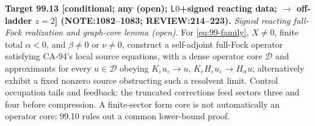 \textbf{Target 99.13 [conditional; any (open); \(\mathsf L0\)+signed reacting data; \(\to\) off-ladder \(z=2\)]
(NOTE:1082--1083; REVIEW:214--223).}
\emph{Signed reacting full-Fock realization and graph-core lemma (open).} For \eqref{eq:99-family}, \(X\ne0\), finite total
\(\alpha<0\), and \(\beta\ne0\) or \(\nu\ne0\), construct a self-adjoint full-Fock operator satisfying CA-94's local source
equations, with a dense operator core \(\mathcal D\) and approximants for every \(u\in\mathcal D\) obeying
\(K_\varepsilon u_\varepsilon\to u\), \(K_\varepsilon H_\varepsilon u_\varepsilon\to H_\alpha u\); alternatively exhibit a fixed nonzero
source obstructing such a resolvent limit. Control occupation tails and feedback: the truncated corrections feed sectors
three and four before compression. A finite-sector form core is not automatically an operator core; 99.10 rules out a common lower-bound proof.
